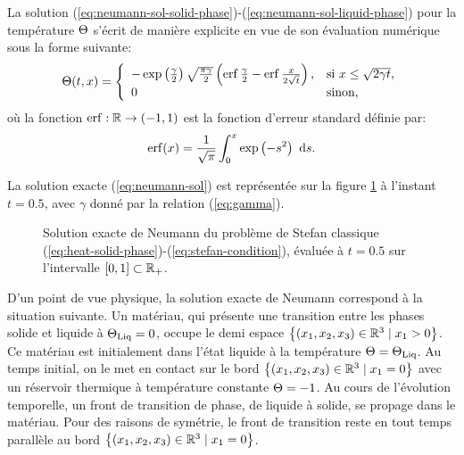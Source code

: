 La solution
(\ref{eq:neumann-sol-solid-phase})-(\ref{eq:neumann-sol-liquid-phase})
pour la température $\Theta$ s'écrit de manière explicite
en vue de son évaluation numérique sous la forme suivante:
\begin{equation}\label{eq:neumann-sol}
  \temperature(t, x) = \left\{
  \begin{array}{ll}
    -\exp\parent{\frac{\gamma}{2}}\sqrt{\frac{\pi\gamma}{2}} %
    \parent{\erf{\frac{\gamma}{2}} - \erf{\frac{x}{2\sqrt{t}}}}, %
    & \text{si } x \leq \sqrt{2\gamma t},\\
    0 %
    & \text{sinon,}
  \end{array}
  \right.
\end{equation}
où la fonction $\operatorname{erf}:\mathbb R\to(-1,1)$ est la fonction d'erreur
standard définie par:
\begin{equation}
  \operatorname{erf}(x) = \frac{1}{\sqrt \pi}\int_0^x \exp\left( -s^2 \right)\,\,\mathrm ds.
\end{equation}

La solution exacte (\ref{eq:neumann-sol}) est représentée sur la
figure \ref{fig:neumann-sol} à l'instant $t = 0.5$, avec $\gamma$
donné par la relation (\ref{eq:gamma}).

\begin{figure}
  \begin{center}
    
    \caption{Solution exacte de Neumann du problème de Stefan classique
      (\ref{eq:heat-solid-phase})-(\ref{eq:stefan-condition}), évaluée
      à $t = 0.5$ sur l'intervalle $[0,1]\subset \mathbb R_+$.}
    \label{fig:neumann-sol}
  \end{center}
\end{figure}

D'un point de vue physique, la solution exacte de Neumann correspond à
la situation suivante. Un matériau, qui présente une transition entre
les phases solide et liquide à $\Theta_\text{Liq} = 0$, occupe le demi espace
$\left\{ (x_1, x_2, x_3)\in \mathbb R^3 \mid x_1 > 0 \right\}$. Ce matériau
est initialement dans l'état liquide à la température $\Theta =
\Theta_\text{Liq}$. Au temps initial, on le met en contact sur le bord
$\left\{ (x_1, x_2, x_3)\in\mathbb R^3 \mid x_1 = 0 \right\}$ avec un
réservoir thermique à température constante $\Theta = -1$. Au
cours de l'évolution temporelle, un front de transition de phase, de
liquide à solide, se propage dans le matériau. Pour des raisons de
symétrie, le front de transition reste en tout temps parallèle au
bord $\left\{ (x_1, x_2, x_3)\in\mathbb R^3 \mid x_1 = 0 \right\}$.

